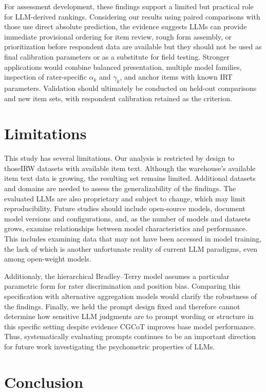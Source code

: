 \documentclass[11pt]{article}
\begin{document}
For assessment development, these findings support a limited but practical role for LLM-derived rankings. Considering our results using paired comparisons with those use direct absolute prediction, the evidence suggests LLMs can provide immediate provisional ordering for item review, rough form assembly, or prioritization before respondent data are available but they should not be used as final calibration parameters or as a substitute for field testing. Stronger applications would combine balanced presentation, multiple model families, inspection of rater-specific $\alpha_k$ and $\gamma_k$, and anchor items with known IRT parameters. Validation should ultimately be conducted on held-out comparisons and new item sets, with respondent calibration retained as the criterion.

\section*{Limitations}
\label{sec:limits}

This study has several limitations. Our analysis is restricted by design to thoseIRW datasets with available item text. Although the warehouse's available item text data is growing, the resulting set remains limited. Additional datasets and domains are needed to assess the generalizability of the findings. The evaluated LLMs are also proprietary and subject to change, which may limit reproducibility. Future studies should include open-source models, document model versions and configurations, and, as the number of models and datasets grows, examine relationships between model characteristics and performance. This includes examining data that may not have been accessed in model training, the lack of which is another unfortunate reality of current LLM paradigms, even among open-weight models.

Additionaly, the hierarchical Bradley--Terry model assumes a particular parametric form for rater discrimination and position bias. Comparing this specification with alternative aggregation models would clarify the robustness of the findings. Finally, we held the prompt design fixed and therefore cannot determine how sensitive LLM judgments are to prompt wording or structure in this specific setting despite evidence CGCoT improves base model performance. Thus, systematically evaluating prompts continues to be an important direction for future work investigating the psychometric properties of LLMs.

\section{Conclusion}
\label{sec:Conclusion}
\end{document}
